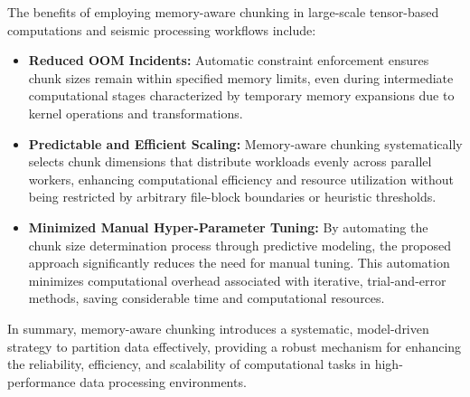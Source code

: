 The benefits of employing memory-aware chunking in large-scale tensor-based computations and seismic processing workflows include:

\begin{itemize}

    \item \textbf{Reduced OOM Incidents:} Automatic constraint enforcement ensures chunk sizes remain within specified memory limits, even during intermediate computational stages characterized by temporary memory expansions due to kernel operations and transformations.

    \item \textbf{Predictable and Efficient Scaling:} Memory-aware chunking systematically selects chunk dimensions that distribute workloads evenly across parallel workers, enhancing computational efficiency and resource utilization without being restricted by arbitrary file-block boundaries or heuristic thresholds.

    \item \textbf{Minimized Manual Hyper-Parameter Tuning:}
    By automating the chunk size determination process through predictive modeling, the proposed approach significantly reduces the need for manual tuning.
    This automation minimizes computational overhead associated with iterative, trial-and-error methods, saving considerable time and computational resources.

\end{itemize}

In summary, memory-aware chunking introduces a systematic, model-driven strategy to partition data effectively, providing a robust mechanism for enhancing the reliability, efficiency, and scalability of computational tasks in high-performance data processing environments.